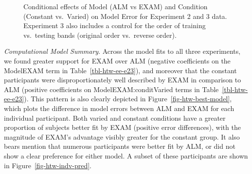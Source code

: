 \documentclass[
  12pt,
  letterpaper,
]{article}
\begin{document}
\begin{figure}


\caption{\label{fig-e2_e3_ae}Conditional effects of Model (ALM vs EXAM)
and Condition (Constant vs.~Varied) on Model Error for Experiment 2 and
3 data. Experiment 3 also includes a control for the order of training
vs.~testing bands (original order vs.~reverse order).}

\end{figure}%

\emph{Computational Model Summary}. Across the model fits to all three
experiments, we found greater support for EXAM over ALM (negative
coefficients on the ModelEXAM term in Table~\ref{tbl-htw-ee-e23}), and
moreover that the constant participants were disproportionately well
described by EXAM in comparison to ALM (positive coefficients on
ModelEXAM:conditVaried terms in Table~\ref{tbl-htw-ee-e23}). This
pattern is also clearly depicted in Figure~\ref{fig-htw-best-model},
which plots the difference in model errors between ALM and EXAM for each
individual participant. Both varied and constant conditions have a
greater proportion of subjects better fit by EXAM (positive error
differences), with the magnitude of EXAM's advantage visibly greater for
the constant group. It also bears mention that numerous participants
were better fit by ALM, or did not show a clear preference for either
model. A subset of these participants are shown in
Figure~\ref{fig-htw-indv-pred}.
\end{document}
